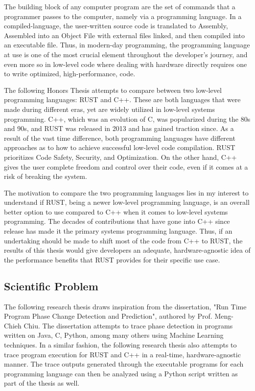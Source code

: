 \documentclass[conference]{IEEEtran}
\begin{document}
The building block of any computer program are the set of commands that a programmer passes to the computer, namely via a programming language. In a compiled-language, the user-written source code is translated to Assembly, Assembled into an Object File with external files linked, and then compiled into an executable file. Thus, in modern-day programming, the programming language at use is one of the most crucial element throughout the developer's journey, and even more so in low-level code where dealing with hardware directly requires one to write optimized, high-performance, code.

The following Honors Thesis attempts to compare between two low-level programming languages: RUST and C++. These are both languages that were made during different eras, yet are widely utilized in low-level systems programming. C++, which was an evolution of C, was popularized during the 80s and 90s, and RUST was released in 2013 and has gained traction since. As a result of the vast time difference, both programming languages have different approaches as to how to achieve successful low-level code compilation. RUST prioritizes Code Safety, Security, and Optimization. On the other hand, C++ gives the user complete freedom and control over their code, even if it comes at a risk of breaking the system. 

The motivation to compare the two programming languages lies in my interest to understand if RUST, being a newer low-level programming language, is an overall better option to use compared to C++ when it comes to low-level systems programming. The decades of contributions that have gone into C++ since release has made it the primary systems programming language. Thus, if an undertaking should be made to shift most of the code from C++ to RUST, the results of this thesis would give developers an adequate, hardware-agnostic idea of the performance benefits that RUST provides for their specific use case. 

\subsection{Scientific Problem}

The following research thesis draws inspiration from the dissertation, "Run Time Program Phase Change Detection and Prediction", authored by Prof. Meng-Chieh Chiu\cite{b1}. The dissertation attempts to trace phase detection in programs written on Java, C, Python, among many others using Machine Learning techniques. In a similar fashion, the following research thesis also attempts to trace program execution for RUST and C++ in a real-time, hardware-agnostic manner. The trace outputs generated through the executable programs for each programming language can then be analyzed using a Python script written as part of the thesis as well. 
\end{document}
